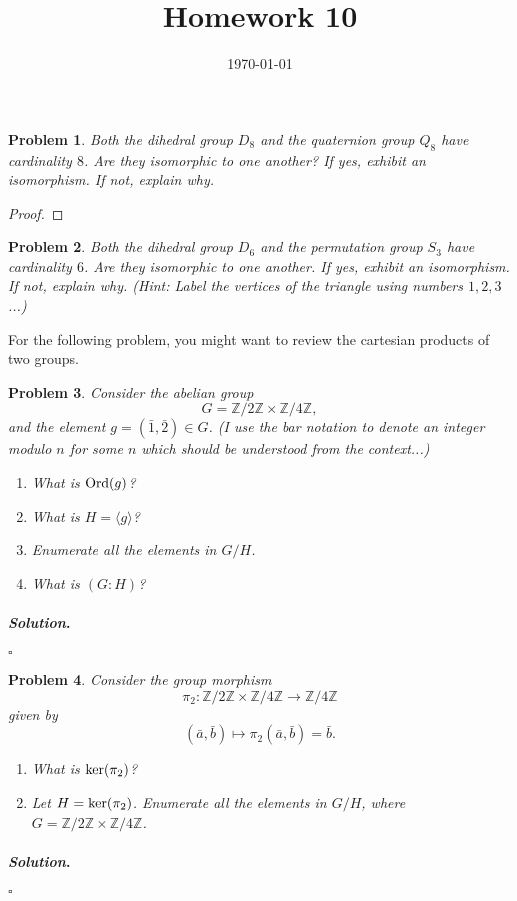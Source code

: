 \documentclass[reqno]{amsart}
\theoremstyle{plain}
\newtheorem{problem}{Problem}
\theoremstyle{definition}
\newenvironment{solution}{\paragraph{\emph{Solution}.}}{\hfill$\square$}
\begin{document}
 

\title[Homework 10]{Homework 10}

\date{\today} 
\maketitle 


\begin{problem}
Both the dihedral group $D_{8}$ and the quaternion group $Q_{8}$ have cardinality $8$.  Are they isomorphic to one another?  If yes, exhibit an isomorphism.  If not, explain why.
\end{problem}
\begin{proof}

\end{proof}

\begin{problem}
Both the dihedral group $D_{6}$ and the permutation group $S_{3}$ have cardinality $6$.  Are they isomorphic to one another.  If yes, exhibit an isomorphism.  If not, explain why.  (Hint:  Label the vertices of the triangle using numbers $1,2,3$...)
\end{problem}


For the following problem, you might want to review the cartesian products of two groups.
\begin{problem}
Consider the abelian group
$$G = \mathbb{Z}/2\mathbb{Z} \times \mathbb{Z}/4\mathbb{Z}, $$
and the element $g = (\bar{1},\bar{2}) \in G$.  (I use the bar notation to denote an integer modulo $n$ for some $n$ which should be understood from the context...)
\begin{enumerate}
\item What is ${\rm Ord}(g)$?
\item What is $H = \langle g\rangle$?
\item Enumerate all the elements in $G/H$.
\item What is $(G:H)$?
\end{enumerate}
\end{problem}
\begin{solution}

\end{solution}

\begin{problem}
Consider the group morphism
$$\pi_{2}: \mathbb{Z}/2\mathbb{Z} \times \mathbb{Z}/4\mathbb{Z} \longrightarrow \mathbb{Z}/4\mathbb{Z}$$
given by 
$$(\bar{a},\bar{b}) \mapsto \pi_{2}(\bar{a},\bar{b}) = \bar{b}.$$
\begin{enumerate}
\item What is ${\rm ker}(\pi_{2})$?
\item Let $H = {\rm ker}(\pi_{2})$.  Enumerate all the elements in $G/H$, where $G=  \mathbb{Z}/2\mathbb{Z} \times \mathbb{Z}/4\mathbb{Z}$.
\end{enumerate}
\end{problem}
\begin{solution}

\end{solution}
\end{document}
